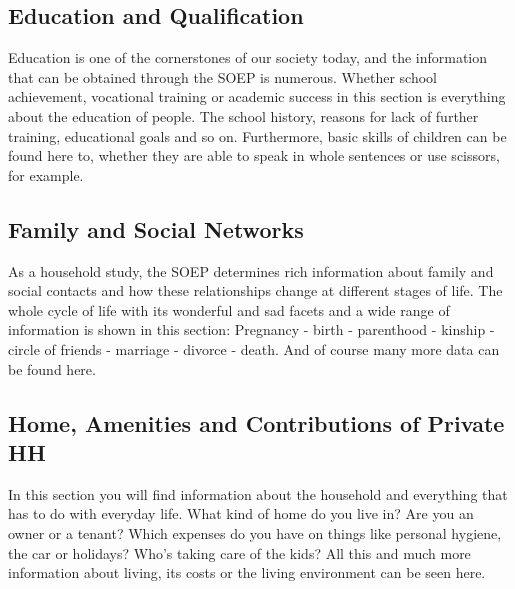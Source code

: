 \documentclass[letterpaper,10pt,openany,onesideH,english]{sphinxmanual}
\begin{document}
\begin{figure}[H]
\centering
{}\end{figure}


\subsection{Education and Qualification}
\label{\detokenize{Contents of SOEPcore/index:education-and-qualification}}
Education is one of the cornerstones of our society today, and the information that can be obtained through the SOEP is numerous. Whether school achievement, vocational training or academic success in this section is everything about the education of people. The school history, reasons for lack of further training, educational goals and so on. Furthermore, basic skills of children can be found here to, whether they are able to speak in whole sentences or use scissors, for example.

\begin{figure}[H]
\centering
{}\end{figure}


\subsection{Family and Social Networks}
\label{\detokenize{Contents of SOEPcore/index:family-and-social-networks}}
As a household study, the SOEP determines rich information about family and social contacts and how these relationships change at different stages of life. The whole cycle of life with its wonderful and sad facets and a wide range of information is shown in this section: Pregnancy - birth - parenthood - kinship - circle of friends - marriage - divorce - death. And of course many more data can be found here.

\begin{figure}[H]
\centering
{}\end{figure}


\subsection{Home, Amenities and Contributions of Private HH}
\label{\detokenize{Contents of SOEPcore/index:home-amenities-and-contributions-of-private-hh}}
In this section you will find information about the household and everything that has to do with everyday life. What kind of home do you live in? Are you an owner or a tenant? Which expenses do you have on things like personal hygiene, the car or holidays? Who’s taking care of the kids? All this and much more information about living, its costs or the living environment can be seen here.
\end{document}

